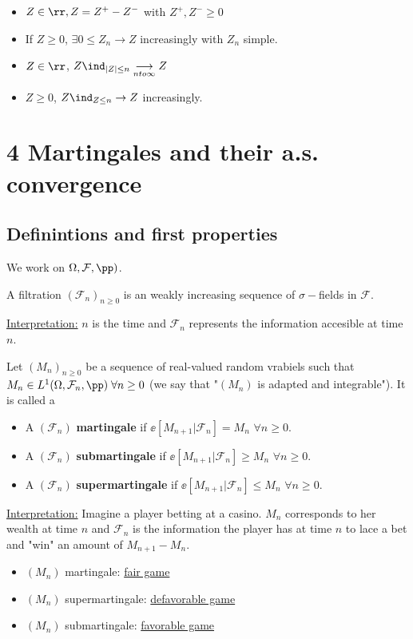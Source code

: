 \documentclass[../main.tex]{subfiles}
\begin{document}
\begin{remark}
  \hfill

  \begin{itemize}
    \item $Z \in \rr, Z = Z^+ - Z^-$ with $Z^+, Z^- \geq 0$
    \item If $Z \geq 0$, $\exists 0 \leq Z_n \to Z$ increasingly with $Z_n$ simple.
    \item $Z \in \rr$, $Z \ind_{|Z| \leq n} \underset{n to
      \infty}{\longrightarrow} Z$
    \item $Z \geq 0$, $Z\ind_{Z \leq n} \to Z$ increasingly.
  \end{itemize}
\end{remark}

\newpage
\section*{4 Martingales and their a.s. convergence}
\subsection{Definintions and first properties}
We work on $\Omega, \mathcal{F}, \pp)$.

\begin{definition}
  A filtration $(\mathcal{F}_n)_{n \geq 0}$ is an weakly increasing sequence of
  $\sigma-$fields in $\mathcal{F}$.
\end{definition}
\underline{Interpretation:} $n$ is the time and $\mathcal{F}_n$ represents the
information accesible at time $n$.

\begin{definition}
  Let $(M_n)_{n \geq 0}$ be a sequence of real-valued random vrabiels such that 
  $M_n \in L^1(\Omega, \mathcal{F}_n, \pp) \;\forall n \geq 0$ (we say that
  "$(M_n)$ is adapted and integrable"). It is called a
  \begin{itemize}
    \item A $(\mathcal{F}_n)$ \textbf{martingale} if $\ee[M_{n+1} |
      \mathcal{F}_n] = M_n$
      $\forall n \geq 0$.
    \item A $(\mathcal{F}_n)$ \textbf{submartingale} if $\ee[M_{n+1} |
      \mathcal{F}_n]
      \geq M_n$
      $\forall n \geq 0$.
    \item A $(\mathcal{F}_n)$ \textbf{supermartingale} if $\ee[M_{n+1} |
      \mathcal{F}_n]
      \leq M_n$
      $\forall n \geq 0$.
  \end{itemize}
\end{definition}
\underline{Interpretation:} Imagine a player betting at a casino. $M_n$
corresponds to her wealth at time $n$ and $\mathcal{F}_n$ is the information the
player has at time $n$ to lace a bet and "win" an amount of $M_{n+1} - M_n$.
\begin{itemize}
  \item $(M_n)$ martingale: \underline{fair game}
  \item $(M_n)$ supermartingale: \underline{defavorable game}
  \item $(M_n)$ submartingale: \underline{favorable game}
\end{itemize}
\end{document}
